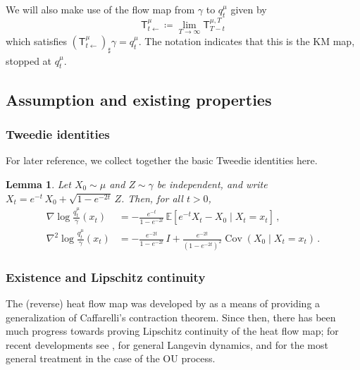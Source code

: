 \documentclass[12pt]{article}
\newcommand{\E}{\mathbb{E}}
\newcommand{\1}{\mathds{1}}
\DeclareMathOperator{\Cov}{Cov}
\newcommand{\deq}{\coloneqq}
\newcommand{\KM}{\mathsf T}
\theoremstyle{plain}
\newtheorem{lemma}[theorem]{Lemma}
\theoremstyle{definition}
\theoremstyle{remark}
\begin{document}
We will also make use of the flow map from $\gamma$ to $q^\mu_t$ given by
\begin{equation}\label{eq:flow-map-q_t}
    \mathsf T^{\mu}_{t \gets} \deq \lim_{T \rightarrow \infty} \mathsf T^{\mu,T}_{T-t}
\end{equation}
which satisfies $(\KM^{\mu}_{t\gets})_{\sharp}\gamma = q^\mu_t$.
The notation indicates that this is the KM map, stopped at $q_t^\mu$.


\subsection{Assumption and existing properties}\label{sec:existing}


\subsubsection{Tweedie identities}


For later reference, we collect together the basic Tweedie identities here.

\begin{lemma}
    Let $X_0 \sim \mu$ and $Z \sim \gamma$ be independent, and write $X_t = e^{-t}\,X_0 + \sqrt{1-e^{-2t}}\,Z$.
    Then, for all $t > 0$,
    \begin{align}
        \nabla \log \frac{q_t^\mu}{\gamma}(x_t)
        &= -\frac{e^{-t}}{1-e^{-2t}}\, \E[e^{-t} X_t - X_0 \mid X_t = x_t]\,,\label{eq:tweedie_one} \\[0.25em]
        \nabla^2 \log \frac{q_t^{\mu}}{\gamma}(x_t)
        &= -\frac{e^{-2t}}{1-e^{-2t}}\,I + \frac{e^{-2t}}{(1-e^{-2t})^2} \Cov(X_0 \mid X_t=x_t)\,.\label{eq:tweedie_two}
    \end{align}
\end{lemma}


\subsubsection{Existence and Lipschitz continuity}


The (reverse) heat flow map was developed by \citet{kim2012generalization} as a means of providing a generalization of Caffarelli's contraction theorem.
Since then, there has been much progress towards proving Lipschitz continuity of the heat flow map; for recent developments see \cite{MikShe23HeatFlow}, \cite{fathi2024transportation, conforti2025coupling} for general Langevin dynamics, and \cite{BriPed25HeatFlow, chaintron_propagation_2025} for the most general treatment in the case of the OU process.
\end{document}
